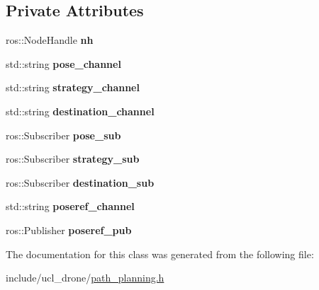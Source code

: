 \subsection*{Private Attributes}
\begin{DoxyCompactItemize}
\item 
\mbox{\label{classPathPlanning_a1835423557580f21ff1d569e892cc0d5}} 
ros\+::\+Node\+Handle {\bfseries nh}
\item 
\mbox{\label{classPathPlanning_a8bcaea60eb993a015a3c419ec8397b40}} 
std\+::string {\bfseries pose\+\_\+channel}
\item 
\mbox{\label{classPathPlanning_ad15e0d527a36593a3af94269a825a3f9}} 
std\+::string {\bfseries strategy\+\_\+channel}
\item 
\mbox{\label{classPathPlanning_a736d7b73b31db35d37d2755aeb20641f}} 
std\+::string {\bfseries destination\+\_\+channel}
\item 
\mbox{\label{classPathPlanning_af1936848055c37f265eb915def4ec015}} 
ros\+::\+Subscriber {\bfseries pose\+\_\+sub}
\item 
\mbox{\label{classPathPlanning_a452296f3a2428ba72c2c724fa30da368}} 
ros\+::\+Subscriber {\bfseries strategy\+\_\+sub}
\item 
\mbox{\label{classPathPlanning_ad97846d17e986769d1b09dc8af51ed9f}} 
ros\+::\+Subscriber {\bfseries destination\+\_\+sub}
\item 
\mbox{\label{classPathPlanning_a6cbf43e103869fd4615ff42961933981}} 
std\+::string {\bfseries poseref\+\_\+channel}
\item 
\mbox{\label{classPathPlanning_a04c7e23384c1072c477262717851cbeb}} 
ros\+::\+Publisher {\bfseries poseref\+\_\+pub}
\end{DoxyCompactItemize}


The documentation for this class was generated from the following file\+:\begin{DoxyCompactItemize}
\item 
include/ucl\+\_\+drone/\hyperlink{path__planning_8h}{path\+\_\+planning.\+h}\end{DoxyCompactItemize}
